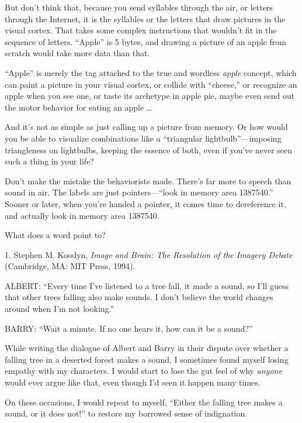 {
 But don't think that, because you send syllables
through the air, or letters through the Internet, it is the syllables
or the letters that draw pictures in the visual cortex. That takes some
complex instructions that wouldn't fit in the sequence
of letters. ``Apple'' is 5 bytes,
and drawing a picture of an apple from scratch would take more data
than that.}

{
 ``Apple'' is merely the tag
attached to the true and wordless \textit{apple} concept, which can
paint a picture in your visual cortex, or collide with
``cheese,'' or recognize an apple
when you see one, or taste its archetype in apple pie, maybe even send
out the motor behavior for eating an apple \ldots}

{
 And it's not as simple as just calling up a
picture from memory. Or how would you be able to visualize combinations
like a ``triangular
lightbulb''---imposing triangleness on lightbulbs,
keeping the essence of both, even if you've never seen
such a thing in your life?}

{
 Don't make the mistake the behaviorists made.
There's far more to speech than sound in air. The
labels are just pointers---``look in memory area
1387540.'' Sooner or later, when
you're handed a pointer, it comes time to dereference
it, and actually look in memory area 1387540.}

{
 What does a word point to?}

\myendsectiontext


\bigskip

{
 1. Stephen M. Kosslyn, \textit{Image and Brain: The Resolution of
the Imagery Debate} (Cambridge, MA: MIT Press, 1994).}


{
 ALBERT: ``Every time I've
listened to a tree fall, it made a sound, so I'll guess
that other trees falling also make sounds. I don't
believe the world changes around when I'm not
looking.''}

{
 BARRY: ``Wait a minute. If no one hears it, how
can it be a sound?''}

{
 While writing the dialogue of Albert and Barry in their dispute
over whether a falling tree in a deserted forest makes a sound, I
sometimes found myself losing empathy with my characters. I would start
to lose the gut feel of why \textit{anyone} would ever argue like that,
even though I'd seen it happen many times.}

{
 On these occasions, I would repeat to myself,
``Either the falling tree makes a sound, or it does
not!'' to restore my borrowed sense of indignation.}

